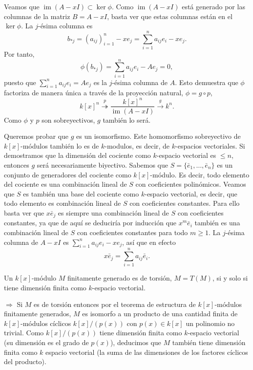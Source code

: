 Veamos que \(\operatorname{im} (A-xI)\subset\ker \phi\). Como
\(\operatorname{im} (A-xI)\) está generado por las columnas de la matriz
\(B=A-xI\), basta ver que estas columnas están en el \(\ker \phi\). La
\(j\)-ésima columna es
\[b_{*j}=(a_{ij})_{i=1}^n-xe_j=\sum_{i=1}^na_{ij}e_i-xe_j.\] Por
tanto, \[\phi(b_{*j})=\sum_{i=1}^na_{ij}e_i-Ae_j=0,\] puesto que
\(\sum_{i=1}^na_{ij}e_i=Ae_j\) es la \(j\)-ésima columna de \(A\).
Esto demuestra que \(\phi\) factoriza de manera única a través de la
proyección natural, \(\phi=g\circ p\),
\[k[x]^n\stackrel{p}\twoheadrightarrow \frac{k[x]^n}{\operatorname{im} (A-xI)}\stackrel{g}\longrightarrow k^n.\]
Como \(\phi\) y \(p\) son sobreyectivos, \(g\) también lo será.

Queremos probar que \(g\) es un isomorfismo. Este homomorfismo
sobreyectivo de \(k[x]\)-módulos también lo es de \(k\)-modulos, es
decir, de \(k\)-espacios vectoriales. Si demostramos que la dimensión
del cociente como \(k\)-espacio vectorial es \(\leq n\), entonces \(g\)
será necesariamente biyectivo. Sabemos que
\(S=\{\bar{e}_1,\dots, \bar{e}_n\}\) es un conjunto de generadores
del cociente como \(k[x]\)-módulo. Es decir, todo elemento del cociente
es una combinación lineal de \(S\) con coeficientes polinómicos. Veamos
que \(S\) es también una base del cociente como \(k\)-espacio vectorial,
es decir, que todo elemento es combinación lineal de \(S\) con
coeficientes constantes. Para ello basta ver que \(x \bar{e}_j\) es
siempre una combinación lineal de \(S\) con coeficientes constantes, ya
que de aquí se deduciría por inducción que \(x^m\bar{e}_i\) también es
una combinación lineal de \(S\) con coeficientes constantes para todo
\(m\geq 1\). La \(j\)-ésima columna de \(A-xI\) es
\(\sum_{i=1}^na_{ij}e_i-xe_j\), así que en efecto
\[x\bar{e}_j=\sum_{i=1}^na_{ij}\bar{e}_i.\] 


Un \(k[x]\)-módulo \(M\) finitamente generado es de torsión, \(M=T(M)\),
si y solo si tiene dimensión finita como \(k\)-espacio vectorial.


\(\Rightarrow\) Si \(M\) es de torsión entonces por el teorema de
estructura de \(k[x]\)-módulos finitamente generados, \(M\) es isomorfo
a un producto de una cantidad finita de \(k[x]\)-módulos cíclicos
\(k[x]/(p(x))\) con \(p(x)\in k[x]\) un polinomio no trivial. Como
\(k[x]/(p(x))\) tiene dimensión finita como \(k\)-espacio vectorial (su
dimensión es el grado de \(p(x)\)), deducimos que \(M\) también tiene
dimensión finita como \(k\) espacio vectorial (la suma de las
dimensiones de los factores cíclicos del producto).


